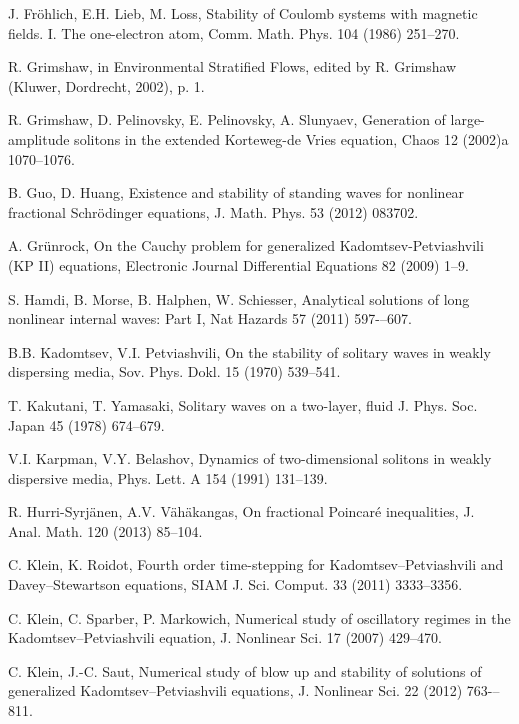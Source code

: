 \documentclass[10pt]{article}
\numberwithin{equation}{section}
\begin{document}
\begin{thebibliography}{00}
		 J. Fr\"{o}hlich, E.H. Lieb,   M. Loss, Stability of Coulomb systems with magnetic fields. I. The one-electron atom, Comm. Math. Phys. 104 (1986) 251--270.
		
			
			R. Grimshaw, in Environmental Stratified Flows, edited by
			R. Grimshaw (Kluwer, Dordrecht, 2002), p. 1.
			
			
			R. Grimshaw, D. Pelinovsky, E. Pelinovsky, A. Slunyaev, 
			Generation of large-amplitude solitons in the extended Korteweg-de Vries equation, Chaos  12 
			(2002)a 1070--1076.
			
			B. Guo, D. Huang,
			Existence and stability of standing waves for nonlinear fractional Schr\"{o}dinger equations,
			J. Math. Phys. 53  (2012) 083702.
			
			A. Gr\"{u}nrock,
			On the Cauchy problem for generalized Kadomtsev-Petviashvili (KP II) equations, Electronic Journal Differential Equations 82 (2009)   1--9.
			
			
			S. Hamdi, B. Morse, B. Halphen, W. Schiesser,
			Analytical solutions of long nonlinear internal waves: Part I,
			Nat Hazards 57 (2011) 597-–607.
			
			B.B. Kadomtsev, V.I. Petviashvili, 
			On the stability of solitary waves in weakly dispersing media,
			Sov. Phys. Dokl. 15 (1970)  539--541.
			
			T. Kakutani, T. Yamasaki,
			Solitary waves on a two-layer,
			fluid J. Phys. Soc. Japan 45 (1978) 674--679.
			
			V.I. Karpman, V.Y. Belashov, Dynamics of two-dimensional solitons in weakly dispersive media, 
			Phys. Lett. A 154 (1991) 131--139.
			
			
			
			R. Hurri-Syrj\"{a}nen,  A.V. V\"{a}h\"{a}kangas, 
			On fractional Poincar\'{e} inequalities,
			J. Anal.   Math. 120 (2013) 85--104.
			
			
			C. Klein, K. Roidot, 
			Fourth order time-stepping for Kadomtsev–Petviashvili and Davey–Stewartson equations, SIAM J. Sci. Comput.  33 (2011) 3333--3356.
			
			C. Klein, C. Sparber,  P. Markowich,
			Numerical study of oscillatory regimes in the Kadomtsev–Petviashvili equation, J. Nonlinear Sci. 17 (2007) 429--470.
			
			C. Klein, J.-C. Saut,
			Numerical study of blow up and stability of solutions of generalized Kadomtsev–Petviashvili equations,
			J. Nonlinear Sci. 22 (2012) 763-–811.
			

\end{thebibliography}
\end{document}

